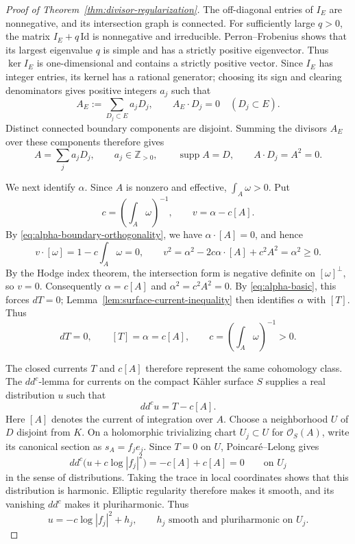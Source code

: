 \documentclass[11pt]{amsart}
\theoremstyle{definition}
\theoremstyle{remark}
\numberwithin{equation}{section}
\newcommand{\OO}{\mathcal O}
\newcommand{\ddc}{dd^c}
\newcommand{\supp}{\operatorname{supp}}
\begin{document}
\begin{proof}[Proof of Theorem~\ref{thm:divisor-regularization}]
The off-diagonal entries of $I_E$ are nonnegative, and its
intersection graph is connected. For sufficiently large $q>0$,
the matrix $I_E+q\,\mathrm{Id}$ is nonnegative and irreducible.
Perron--Frobenius shows that its largest eigenvalue $q$ is simple
and has a strictly positive eigenvector. Thus $\ker I_E$ is
one-dimensional and contains a strictly positive vector.
Since $I_E$ has integer entries, its kernel has a rational
generator; choosing its sign and clearing denominators gives
positive integers $a_j$ such that
\[
 A_E:=\sum_{D_j\subset E}a_jD_j,
 \qquad A_E\cdot D_j=0\quad(D_j\subset E).
\]
Distinct connected boundary components are disjoint. Summing
the divisors $A_E$ over these components therefore gives
\begin{equation}\label{eq:full-support-null-divisor}
 A=\sum_j a_jD_j,\qquad a_j\in\mathbb Z_{>0},\qquad
 \supp A=D,\qquad A\cdot D_j=A^2=0.
\end{equation}

We next identify $\alpha$. Since $A$ is nonzero and effective,
$\int_A\omega>0$. Put
\[
 c=\left(\int_A\omega\right)^{-1},
 \qquad v=\alpha-c[A].
\]
By \eqref{eq:alpha-boundary-orthogonality}, we have
$\alpha\cdot[A]=0$, and hence
\[
 v\cdot[\omega]=1-c\int_A\omega=0,
 \qquad
 v^2=\alpha^2-2c\alpha\cdot[A]+c^2A^2=\alpha^2\ge0.
\]
By the Hodge index theorem, the intersection form is negative
definite on $[\omega]^\perp$, so $v=0$. Consequently $\alpha=c[A]$ and
$\alpha^2=c^2A^2=0$. By \eqref{eq:alpha-basic}, this forces $dT=0$;
Lemma~\ref{lem:surface-current-inequality} then identifies
$\alpha$ with $[T]$. Thus
\begin{equation}\label{eq:closed-current-null-class}
 dT=0,\qquad [T]=\alpha=c[A],\qquad
 c=\left(\int_A\omega\right)^{-1}>0.
\end{equation}

The closed currents $T$ and $c[A]$ therefore represent the same
cohomology class. The $\ddc$-lemma for currents on the compact
K\"ahler surface $S$ supplies a real distribution $u$ such that
\begin{equation}\label{eq:global-log-potential}
 \ddc u=T-c[A].
\end{equation}
Here $[A]$ denotes the current of integration over $A$.
Choose a neighborhood $U$ of $D$ disjoint from $K$.
On a holomorphic trivializing chart $U_j\subset U$ for
$\OO_S(A)$, write its canonical section as $s_A=f_j e_j$.
Since $T=0$ on $U$, Poincar\'e--Lelong gives
\[
 \ddc\bigl(u+c\log|f_j|^2\bigr)
 =-c[A]+c[A]=0\qquad\text{on }U_j
\]
in the sense of distributions. Taking the trace in local
coordinates shows that this distribution is harmonic.
Elliptic regularity therefore makes it smooth, and its
vanishing $\ddc$ makes it pluriharmonic. Thus
\begin{equation}\label{eq:local-log-collar}
 u=-c\log|f_j|^2+h_j,
 \qquad h_j\text{ smooth and pluriharmonic on }U_j.
\end{equation}


\end{proof}
\end{document}
